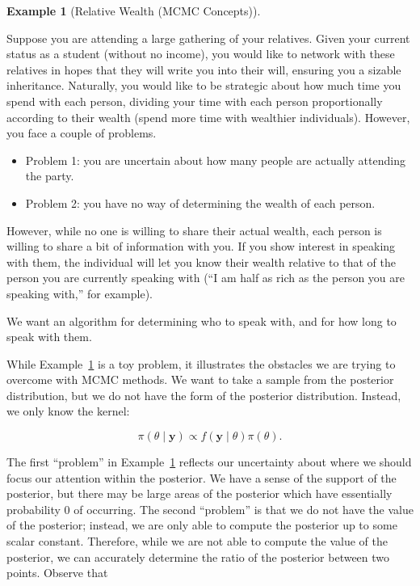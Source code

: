 \documentclass[
  letterpaper,
  DIV=11,
  numbers=noendperiod]{scrreprt}
\providecommand{\tightlist}{%
  \setlength{\itemsep}{0pt}\setlength{\parskip}{0pt}}\usepackage{longtable,booktabs,array}
\theoremstyle{definition}
\theoremstyle{plain}
\theoremstyle{definition}
\newtheorem{example}{Example}[chapter]
\theoremstyle{remark}
\begin{document}
\begin{example}[Relative Wealth (MCMC
Concepts)]\protect\hypertarget{exm-mcmc-concepts}{}\label{exm-mcmc-concepts}

Suppose you are attending a large gathering of your relatives. Given
your current status as a student (without no income), you would like to
network with these relatives in hopes that they will write you into
their will, ensuring you a sizable inheritance. Naturally, you would
like to be strategic about how much time you spend with each person,
dividing your time with each person proportionally according to their
wealth (spend more time with wealthier individuals). However, you face a
couple of problems.

\begin{itemize}
\tightlist
\item
  Problem 1: you are uncertain about how many people are actually
  attending the party.\\
\item
  Problem 2: you have no way of determining the wealth of each person.
\end{itemize}

However, while no one is willing to share their actual wealth, each
person is willing to share a bit of information with you. If you show
interest in speaking with them, the individual will let you know their
wealth relative to that of the person you are currently speaking with
(``I am half as rich as the person you are speaking with,'' for
example).

We want an algorithm for determining who to speak with, and for how long
to speak with them.

\end{example}

While Example~\ref{exm-mcmc-concepts} is a toy problem, it illustrates
the obstacles we are trying to overcome with MCMC methods. We want to
take a sample from the posterior distribution, but we do not have the
form of the posterior distribution. Instead, we only know the kernel:

\[\pi(\theta \mid \mathbf{y}) \propto f(\mathbf{y} \mid \theta) \pi(\theta).\]

The first ``problem'' in Example~\ref{exm-mcmc-concepts} reflects our
uncertainty about where we should focus our attention within the
posterior. We have a sense of the support of the posterior, but there
may be large areas of the posterior which have essentially probability 0
of occurring. The second ``problem'' is that we do not have the value of
the posterior; instead, we are only able to compute the posterior up to
some scalar constant. Therefore, while we are not able to compute the
value of the posterior, we can accurately determine the ratio of the
posterior between two points. Observe that
\end{document}
